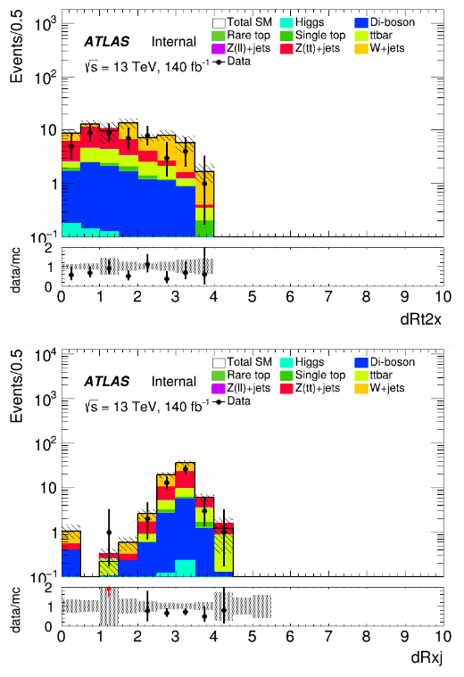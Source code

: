 \documentclass[usenames,dvipsnames]{beamer}
\begin{document}
\begin{frame}
    \begin{minipage}{0.32\textwidth}
        \centering
        \includegraphics[width=\textwidth]{graphics/HHH_met/HHH_met_dRt2x.png}
    \end{minipage}
    \hfill
    \begin{minipage}{0.32\textwidth}
        \centering
        \includegraphics[width=\textwidth]{graphics/HHH_met/HHH_met_dRxj.png}
    \end{minipage}
    \hfill
    \begin{minipage}{0.32\textwidth}
        \centering

\end{minipage}
\end{frame}
\end{document}

